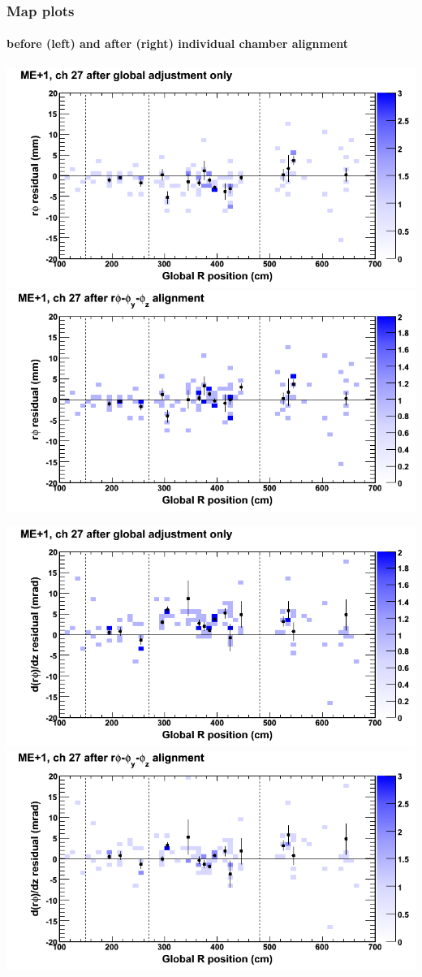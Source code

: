 \documentclass[compress]{beamer}
\begin{document}
\begin{frame}
\frametitle{Map plots}
\framesubtitle{before (left) and after (right) individual chamber alignment}
\includegraphics[width=0.5\linewidth]{ringmapplots_3dof/before_CSCvsr_mep1ch27_x.png} \includegraphics[width=0.5\linewidth]{ringmapplots_3dof/after_CSCvsr_mep1ch27_x.png}

\includegraphics[width=0.5\linewidth]{ringmapplots_3dof/before_CSCvsr_mep1ch27_dxdz.png} \includegraphics[width=0.5\linewidth]{ringmapplots_3dof/after_CSCvsr_mep1ch27_dxdz.png}
\end{frame}
\end{document}
